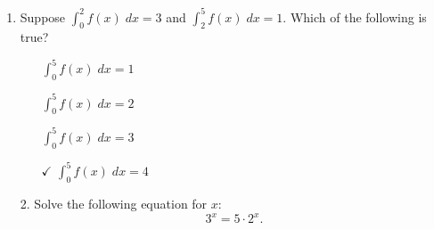 \documentclass[11pt]{article}
\begin{document}
\pagestyle{empty}
\newsavebox{\quizfront}
\begin{lrbox}{\quizfront}
\begin{minipage}[top][4.5in][t]{\textwidth} \setlength{\parindent}{1.5em}
\drawtitle
\vspace{-0.5in}
\begin{enumerate}

\item Suppose $\displaystyle\int_0^2 f(x)\;dx = 3$ and
  $\displaystyle\int_2^5 f(x)\;dx = 1$. Which of the following is
  true?

  \vfill

  \begin{itemize}
  \item[\textbigcircle] $\displaystyle\int_0^5 f(x)\;dx = 1$
    \vfill
  \item[\textbigcircle] $\displaystyle\int_0^5 f(x)\;dx = 2$
    \vfill
  \item[\textbigcircle] $\displaystyle\int_0^5 f(x)\;dx = 3$
    \vfill
  \item[\textcircled{{\color{blue}$\checkmark$}}] $\displaystyle\int_0^5 f(x)\;dx = 4$
    \vfill
  \end{itemize}



\end{enumerate}



\end{minipage}
\end{lrbox}

\newsavebox{\quizback}
\begin{lrbox}{\quizback}
\begin{minipage}[top][4.5in][t]{\textwidth} \setlength{\parindent}{1.5em}
\begin{itemize}
\item[2.] Solve the following equation for $x$:
  \[
  3^x = 5\cdot 2^x.
  \]


\end{itemize}
\end{minipage}
\end{lrbox}

\noindent \usebox{\quizfront}

\end{document}
